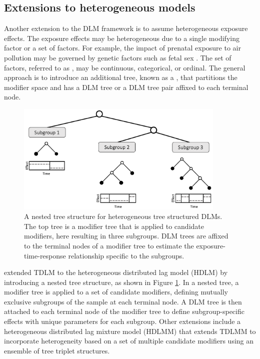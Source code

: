 \subsection{Extensions to heterogeneous models} \label{sec:het}
Another extension to the DLM framework is to assume heterogeneous exposure effects. The exposure effects may be heterogeneous due to a single modifying factor or a set of factors. For example, the impact of prenatal exposure to air pollution may be governed by genetic factors such as fetal sex \citep{rosa_association_2019}. The set of factors, referred to as , may be continuous, categorical, or ordinal. The general approach is to introduce an additional tree, known as a , that partitions the modifier space and has a DLM tree or a DLM tree pair affixed to each terminal node.
\begin{figure}[ht]
    \centering
    \includegraphics[width = 100mm]{images/nestedtree.png}
        \caption{A nested tree structure for heterogeneous tree structured DLMs. The top tree is a modifier tree that is applied to candidate modifiers, here resulting in three subgroups. DLM trees are affixed to the terminal nodes of a modifier tree to estimate the exposure-time-response relationship specific to the subgroups.}
    \label{fig:nesttree}
\end{figure}
\cite{mork_heterogeneous_2023} extended TDLM to the heterogeneous distributed lag model (HDLM) by introducing a nested tree structure, as shown in Figure \ref{fig:nesttree}. In a nested tree, a modifier tree is applied to a set of candidate modifiers, defining mutually exclusive subgroups of the sample at each terminal node. A DLM tree is then attached to each terminal node of the modifier tree to define subgroup-specific effects with unique parameters for each subgroup. Other extensions include a heterogeneous distributed lag mixture model (HDLMM) that extends TDLMM to incorporate heterogeneity based on a set of multiple candidate modifiers using an ensemble of tree triplet structures.

